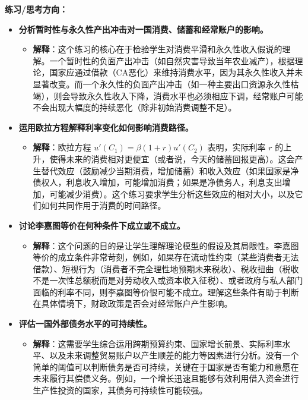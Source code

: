 \documentclass[12pt]{article}
\begin{document}
\textbf{练习/思考方向：}
\begin{itemize}
    \item \textbf{分析暂时性与永久性产出冲击对一国消费、储蓄和经常账户的影响。}
    \begin{itemize}
        \item \textbf{解释}：这个练习的核心在于检验学生对消费平滑和永久性收入假说的理解。一个暂时性的负面产出冲击（如自然灾害导致当年农业减产），根据理论，国家应通过借款（CA恶化）来维持消费水平，因为其永久性收入并未显著改变。而一个永久性的负面产出冲击（如一种主要出口资源永久性枯竭），则会导致永久性收入下降，消费水平也必须相应下调，经常账户可能不会出现大幅度的持续恶化（除非初始消费调整不足）。
    \end{itemize}
    \item \textbf{运用欧拉方程解释利率变化如何影响消费路径。}
    \begin{itemize}
        \item \textbf{解释}：欧拉方程 $u'(C_1) = \beta(1+r)u'(C_2)$  表明，实际利率 $r$ 的上升，使得未来的消费相对更便宜（或者说，今天的储蓄回报更高）。这会产生替代效应（鼓励减少当期消费，增加储蓄）和收入效应（如果国家是净债权人，利息收入增加，可能增加消费；如果是净债务人，利息支出增加，可能减少消费）。这个练习要求学生分析这些效应的相对大小，以及它们如何共同作用于消费的时间路径。
    \end{itemize}
    \item \textbf{讨论李嘉图等价在何种条件下成立或不成立。}
    \begin{itemize}
        \item \textbf{解释}：这个问题的目的是让学生理解理论模型的假设及其局限性。李嘉图等价的成立条件非常苛刻，例如，如果存在流动性约束（某些消费者无法借款）、短视行为（消费者不完全理性地预期未来税收）、税收扭曲（税收不是一次性总额税而是对劳动收入或资本收入征税）、或者政府与私人部门面临的利率不同，则李嘉图等价很可能不成立。理解这些条件有助于判断在具体情境下，财政政策是否会对经常账户产生影响。
    \end{itemize}
    \item \textbf{评估一国外部债务水平的可持续性。}
    \begin{itemize}
        \item \textbf{解释}：这需要学生综合运用跨期预算约束、国家增长前景、实际利率水平、以及未来调整贸易账户以产生顺差的能力等因素进行分析。没有一个简单的阈值可以判断债务是否可持续，关键在于国家是否有能力和意愿在未来履行其偿债义务。例如，一个增长迅速且能够有效利用借入资金进行生产性投资的国家，其债务可持续性可能较强。
    \end{itemize}
\end{itemize}
\end{document}
